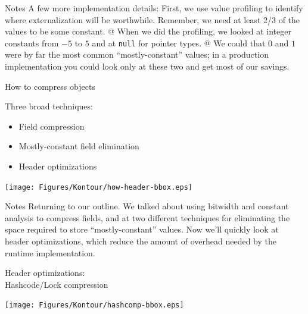 \documentclass[%
pdf,
colorBG,
slideColor,
nototal,
oqe
]{prosper}
\renewcommand{\yellow}{\colC}
\newenvironment{talknotes}{\begin{slide}{Notes}\tiny}{\end{slide}}
\begin{document}
\begin{talknotes}
A few more implementation details:
First, we use value profiling to identify where externalization will
be worthwhile.  Remember, we need at least 2/3 of the values to be
some constant.  @ When we did the profiling, we looked at integer
constants from $-5$ to $5$ and at {\tt null} for pointer types.
@ We could that $0$ and $1$ were by far the most common
``mostly-constant'' values;  in a production implementation you
could look only at these two and get most of our savings.
\end{talknotes}

\begin{slide}{How to compress objects} %

Three broad techniques:

\parbox[b]{2.5in}{%
\begin{itemize}%
\lightgray\renewcommand{\green}{\lightgray}%
\item Field compression
\lightgray\renewcommand{\green}{\lightgray}%
\item Mostly-constant field elimination
\headeropt\renewcommand{\green}{\headeropt}%
\item Header optimizations
\renewcommand{\green}{\yellow} %
\end{itemize}
}%
\parbox[b]{1.75in}{%
\texttt{[image: Figures/Kontour/how-header-bbox.eps]}%
}%
\end{slide}

\begin{talknotes}
Returning to our outline.  We talked about using bitwidth and constant
analysis to compress fields, and at two different techniques for
eliminating the space required to store ``mostly-constant'' values.
Now we'll quickly look at header optimizations, which reduce the amount of
overhead needed by the runtime implementation.
\end{talknotes}

\begin{slide}{Header optimizations:\\\small Hashcode/Lock compression}
\begin{center}
\vspace{.5cm}
\texttt{[image: Figures/Kontour/hashcomp-bbox.eps]}
\end{center}
\end{slide}
\end{document}
